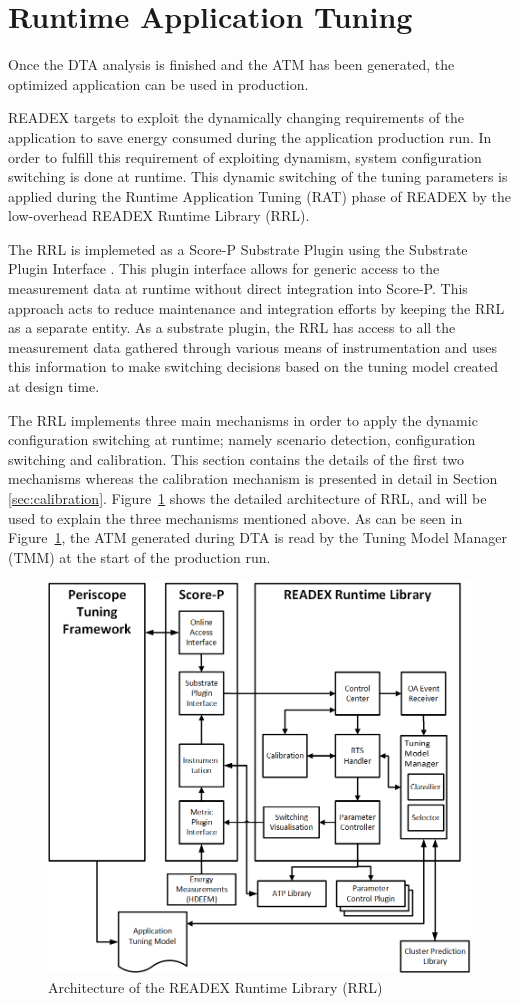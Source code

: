 \section{Runtime Application Tuning} \label{rat}

Once the DTA analysis is finished and the ATM has been generated, the optimized application can be used in production. 

READEX targets to exploit the dynamically changing requirements of the application to save energy consumed during the application production run. In order to fulfill this requirement of exploiting dynamism, system configuration switching is done at runtime. This dynamic switching of the tuning parameters is applied during the Runtime Application Tuning (RAT) phase of READEX by the low-overhead READEX Runtime Library (RRL). 

The RRL is implemeted as a Score-P Substrate Plugin using the Substrate Plugin Interface \cite{Schoene2017}. This plugin interface allows for generic access to the measurement data at runtime without direct integration into Score-P. This approach acts to reduce maintenance and integration efforts by keeping the RRL as a separate entity. As a substrate plugin, the RRL has
access to all the measurement data gathered through various means of instrumentation and uses this information to make switching decisions based on the tuning model created at design time.

The RRL implements three main mechanisms in order to apply the dynamic configuration switching at runtime; namely scenario detection, configuration switching and calibration. This section contains the details of the first two mechanisms whereas the calibration mechanism is presented in detail in Section \ref{sec:calibration}.
Figure~\ref{fig:rrl} shows the detailed architecture of RRL, and will be used to explain the three mechanisms mentioned above. 
As can be seen in Figure~\ref{fig:rrl}, the ATM generated during DTA is read by the Tuning Model Manager (TMM) at the start of the production run.

\begin{figure}[!t]
\centering
\includegraphics[width=.8\columnwidth]{figures/RRL_Architecture.png}
\caption{Architecture of the READEX Runtime Library (RRL)}
\label{fig:rrl}
\end{figure}

